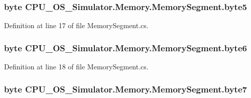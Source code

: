 \subsubsection[{byte5}]{\setlength{\rightskip}{0pt plus 5cm}byte C\+P\+U\+\_\+\+O\+S\+\_\+\+Simulator.\+Memory.\+Memory\+Segment.\+byte5\hspace{0.3cm}{\ttfamily [private]}}\label{class_c_p_u___o_s___simulator_1_1_memory_1_1_memory_segment_a6d35dbdcd3428e9a1869fda265341123}


Definition at line 17 of file Memory\+Segment.\+cs.

\hypertarget{class_c_p_u___o_s___simulator_1_1_memory_1_1_memory_segment_a242f25c3861a3c0d1d51484203ea8603}{}
\subsubsection[{byte6}]{\setlength{\rightskip}{0pt plus 5cm}byte C\+P\+U\+\_\+\+O\+S\+\_\+\+Simulator.\+Memory.\+Memory\+Segment.\+byte6\hspace{0.3cm}{\ttfamily [private]}}\label{class_c_p_u___o_s___simulator_1_1_memory_1_1_memory_segment_a242f25c3861a3c0d1d51484203ea8603}


Definition at line 18 of file Memory\+Segment.\+cs.

\hypertarget{class_c_p_u___o_s___simulator_1_1_memory_1_1_memory_segment_af4a4ab7c802e0a5b5f3684c0cfac5f80}{}
\subsubsection[{byte7}]{\setlength{\rightskip}{0pt plus 5cm}byte C\+P\+U\+\_\+\+O\+S\+\_\+\+Simulator.\+Memory.\+Memory\+Segment.\+byte7\hspace{0.3cm}{\ttfamily [private]}}\label{class_c_p_u___o_s___simulator_1_1_memory_1_1_memory_segment_af4a4ab7c802e0a5b5f3684c0cfac5f80}


